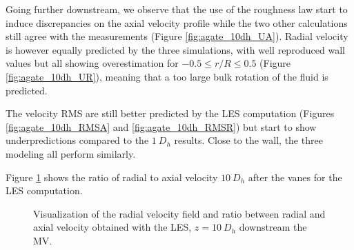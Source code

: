 Going further downstream, we observe that the use of the roughness law start to induce discrepancies on the axial velocity profile while the two other calculations still agree with the measurements (Figure \ref{fig:agate_10dh_UA}). Radial velocity is however equally predicted by the three simulations, with well reproduced wall values but all showing overestimation for $-0.5 \leq r/R \leq 0.5$ (Figure \ref{fig:agate_10dh_UR}), meaning that a too large bulk rotation of the fluid is predicted. 

\npar

The velocity RMS are still better predicted by the LES computation (Figures \ref{fig:agate_10dh_RMSA} and \ref{fig:agate_10dh_RMSR}) but start to show underpredictions compared to the $1\ D_{h}$ results. Close to the wall, the three modeling all perform similarly.


\npar

Figure \ref{fig:ur_s_ua_10dh} shows the ratio of radial to axial velocity $10~D_{h}$ after the vanes for the LES computation.

\begin{figure}
\caption{Visualization of the radial velocity field and ratio between radial and axial velocity obtained with the LES, $z=10~D_{h}$ downstream the MV.}
\label{fig:ur_s_ua_10dh}
\end{figure}



